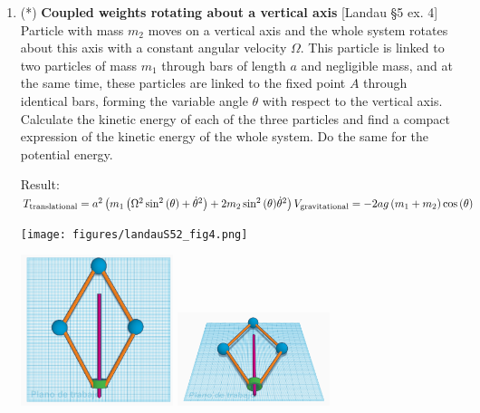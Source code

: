 \documentclass[11pt, a4paper, twoside]{article}
\begin{document}
\begin{enumerate}
\item
	\begin{minipage}[t][7cm]{0.65\textwidth}
		(*) \textbf{Coupled weights rotating about a vertical axis} [Landau \S5 ex. 4]\\
		Particle with mass $m_2$ moves on a vertical axis and the whole system rotates about this axis with a constant angular velocity $\Omega$. This particle is linked to two particles of mass $m_1$ through bars of length $a$ and negligible mass, and at the same time, these particles are linked to the fixed point $A$ through identical bars, forming the variable angle $\theta$ with respect to the vertical axis.
		Calculate the kinetic energy of each of the three particles and find a compact expression of the kinetic energy of the whole system. Do the same for the potential energy.

		Result:\\
		\(
			T_\text{translational} = a^{2} \left( m_{1} \left( \Omega^{2} \sin^{2}{\left(\theta \right)} + \dot{\theta}^{2}\right) + 2 m_{2} \sin^{2}{\left(\theta \right)} \dot{\theta}^{2} \right) \\
			V_\text{gravitational} = - 2 a g \left(m_{1} + m_{2}\right) \cos{\left(\theta \right)}
		\)
	\end{minipage}
	\begin{minipage}[c][1cm][t]{0.35\textwidth}
		\texttt{[image: figures/landauS52\_fig4.png]}
	\end{minipage}

	\begin{center}
		\includegraphics[width=0.35\textwidth]{figures/rotantesAcopladas1.png}
		\includegraphics[width=0.35\textwidth]{figures/rotantesAcopladas2.png}
	\end{center}


\end{enumerate}
\end{document}
